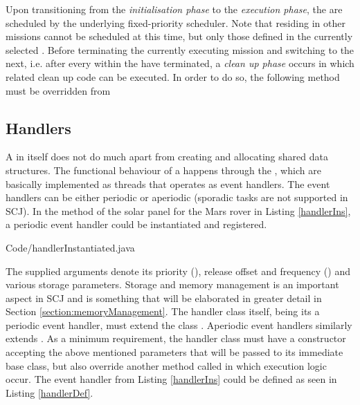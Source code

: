Upon transitioning from the \textit{initialisation phase} to the \textit{execution phase}, the  are scheduled by the underlying fixed-priority scheduler. Note that  residing in other missions cannot be scheduled at this time, but only those defined in the currently selected . Before terminating the currently executing mission and switching to the next, i.e. after every  within the  have terminated, a \textit{clean up phase} occurs in which  related clean up code can be executed. In order to do so, the following method must be overridden from 

\begin{quotation}
\end{quotation}

\subsection{Handlers}
\label{subsection:handlers}
A  in itself does not do much apart from creating  and allocating shared data structures. The functional behaviour of a  happens through the , which are basically implemented as threads that operates as event handlers. The event handlers can be either periodic or aperiodic (sporadic tasks are not supported in SCJ). In the  method of the solar panel  for the Mars rover in Listing \ref{handlerIns}, a periodic event handler could be instantiated and registered.


{Code/handlerInstantiated.java}

The supplied arguments denote its priority (), release offset and frequency () and various storage parameters. Storage and memory management is an important aspect in SCJ and is something that will be elaborated in greater detail in Section \ref{section:memoryManagement}. The handler class itself, being its a periodic event handler, must extend the class . Aperiodic event handlers similarly extends . As a minimum requirement, the handler class must have a constructor accepting the above mentioned parameters that will be passed to its immediate base class, but also override another method called  in which execution logic occur. The event handler from Listing \ref{handlerIns} could be defined as seen in Listing \ref{handlerDef}.

